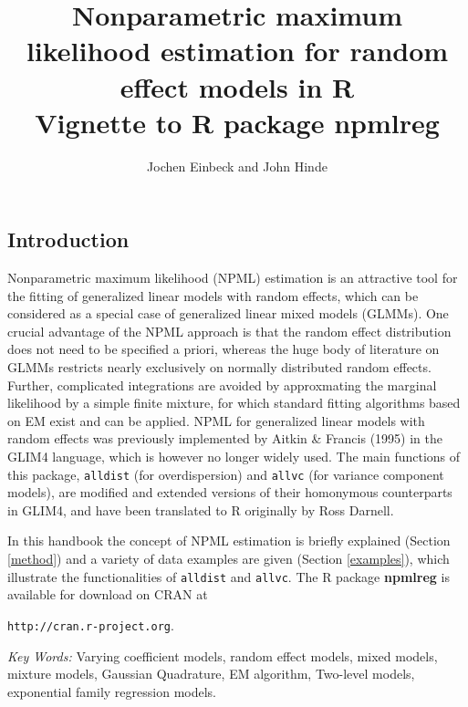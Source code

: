 \documentclass[a4paper]{article}
\title{Nonparametric maximum likelihood estimation for random effect models in R\\
\vspace{1cm}
\large Vignette to R package {\bf npmlreg}}
\author{Jochen Einbeck and John Hinde}
\begin{document}
\begin{landscape}
\pagestyle{plain}


\maketitle
\thispagestyle{empty}


\newpage
\tableofcontents

\newpage

\section{Introduction}

Nonparametric maximum likelihood (NPML) estimation is an attractive tool for the fitting 
of generalized linear models with random effects, 
which can be considered as a special case of generalized linear mixed models (GLMMs).  
One crucial advantage of the NPML approach is that the random effect distribution does not need 
to be specified a priori, whereas the huge body of literature on GLMMs restricts nearly exclusively 
on normally distributed random effects. Further, complicated integrations are avoided by approxmating 
the marginal likelihood by a simple finite mixture, for which standard fitting algorithms based on EM 
exist and can be applied. NPML for generalized linear models with random effects was previously implemented 
by Aitkin \& Francis (1995) in the GLIM4 language, which is however no longer widely used. The main functions 
of this package,  {\tt alldist}  (for overdispersion) and {\tt allvc} (for variance component models), 
are  modified and extended versions of their homonymous counterparts in GLIM4, and have been translated 
to R originally by Ross Darnell.



In this handbook the concept of NPML estimation is briefly explained (Section \ref{method}) and
 a variety of  data examples are given (Section \ref{examples}), which illustrate the functionalities 
 of {\tt alldist} and {\tt allvc}. The  R package {\bf npmlreg} is available for download on CRAN at
\begin{center}
{\tt http://cran.r-project.org}.
\end{center}

 
\vspace{0.3cm}
{\em Key Words:}
 Varying coefficient models, random effect models, mixed models, mixture models,  Gaussian Quadrature, EM algorithm, Two-level models,
 exponential family regression models.
   


\end{landscape}
\end{document}
